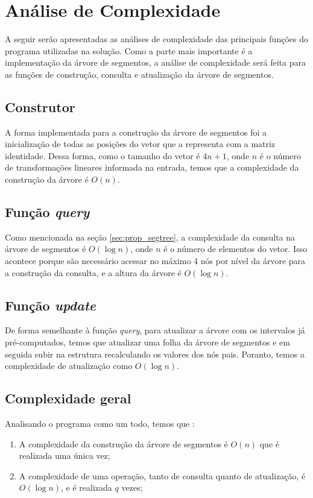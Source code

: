\documentclass{article}
\begin{document}
\section{Análise de Complexidade}

A seguir serão apresentadas as análises de complexidade das principais funções do programa utilizadas na solução.
Como a parte mais importante é a implementação da árvore de segmentos, a análise de complexidade será feita para as funções de construção, consulta e atualização da árvore de segmentos.

\subsection{Construtor}
A forma implementada para a construção da árvore de segmentos foi a inicialização de todas as posições do vetor que a representa com a matriz identidade. 
Dessa forma, como o tamanho do vetor é $4n + 1$, onde $n$ é o número de transformações lineares informada na entrada, temos que a complexidade da construção da árvore é $O(n)$.

\subsection{Função \emph{query}}

Como mencionada na seção \ref{sec:prop_segtree}, a complexidade da consulta na árvore de segmentos é $O(\log n)$, onde $n$ é o número de elementos do vetor. Isso acontece porque são necessário acessar no máximo 4 nós por nível da árvore para a construção da consulta, e a altura da árvore é $O(\log n)$.

\subsection{Função \emph{update}}

De forma semelhante à função \emph{query}, para atualizar a árvore com os intervalos já pré-computados, temos que atualizar uma folha da árvore de segmentos e em seguida subir na estrutura recalculando os valores dos nós pais. 
Poranto, temos a complexidade de atualização como $O(\log n)$.

\subsection{Complexidade geral}

Analisando o programa como um todo, temos que :
\begin{enumerate}
    \item A complexidade da construção da árvore de segmentos é $O(n)$ que é realizada uma única vez;
    \item A complexidade de uma operação, tanto de consulta quanto de atualização, é $O(\log n)$, e é realizada $q$ vezes;
\end{enumerate}
\end{document}
